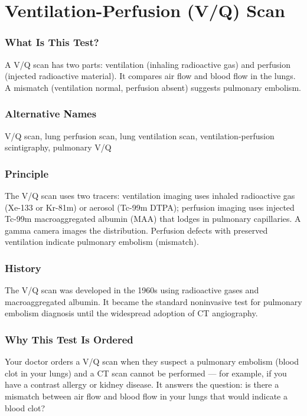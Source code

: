 \section{Ventilation-Perfusion (V/Q) Scan}


\subsubsection*{What Is This Test?}
A V/Q scan has two parts: ventilation (inhaling radioactive gas) and perfusion (injected radioactive material). It compares air flow and blood flow in the lungs. A mismatch (ventilation normal, perfusion absent) suggests pulmonary embolism.

\subsubsection*{Alternative Names}
V/Q scan, lung perfusion scan, lung ventilation scan, ventilation-perfusion scintigraphy, pulmonary V/Q


\subsubsection*{Principle}
The V/Q scan uses two tracers: ventilation imaging uses inhaled radioactive gas (Xe-133 or Kr-81m) or aerosol (Tc-99m DTPA); perfusion imaging uses injected Tc-99m macroaggregated albumin (MAA) that lodges in pulmonary capillaries. A gamma camera images the distribution. Perfusion defects with preserved ventilation indicate pulmonary embolism (mismatch).

\subsubsection*{History}
The V/Q scan was developed in the 1960s using radioactive gases and macroaggregated albumin. It became the standard noninvasive test for pulmonary embolism diagnosis until the widespread adoption of CT angiography.

\subsubsection*{Why This Test Is Ordered}
Your doctor orders a V/Q scan when they suspect a pulmonary embolism (blood clot in your lungs) and a CT scan cannot be performed --- for example, if you have a contrast allergy or kidney disease. It answers the question: is there a mismatch between air flow and blood flow in your lungs that would indicate a blood clot?

